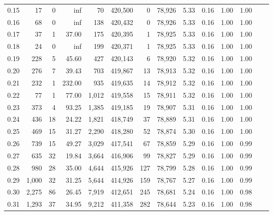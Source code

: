 \begin{tabular}{rrrrrrrrrrrrrr}
0.15 &      17 &      0 &     inf &       70 &  420,500 &       0 &  78,926 &  5.33 &  0.16 &  1.00 &      1.00 \\
0.16 &      68 &      0 &     inf &      138 &  420,432 &       0 &  78,926 &  5.33 &  0.16 &  1.00 &      1.00 \\
0.17 &      37 &      1 &   37.00 &      175 &  420,395 &       1 &  78,925 &  5.33 &  0.16 &  1.00 &      1.00 \\
0.18 &      24 &      0 &     inf &      199 &  420,371 &       1 &  78,925 &  5.33 &  0.16 &  1.00 &      1.00 \\
0.19 &     228 &      5 &   45.60 &      427 &  420,143 &       6 &  78,920 &  5.32 &  0.16 &  1.00 &      1.00 \\
0.20 &     276 &      7 &   39.43 &      703 &  419,867 &      13 &  78,913 &  5.32 &  0.16 &  1.00 &      1.00 \\
0.21 &     232 &      1 &  232.00 &      935 &  419,635 &      14 &  78,912 &  5.32 &  0.16 &  1.00 &      1.00 \\
0.22 &      77 &      1 &   77.00 &    1,012 &  419,558 &      15 &  78,911 &  5.32 &  0.16 &  1.00 &      1.00 \\
0.23 &     373 &      4 &   93.25 &    1,385 &  419,185 &      19 &  78,907 &  5.31 &  0.16 &  1.00 &      1.00 \\
0.24 &     436 &     18 &   24.22 &    1,821 &  418,749 &      37 &  78,889 &  5.31 &  0.16 &  1.00 &      1.00 \\
0.25 &     469 &     15 &   31.27 &    2,290 &  418,280 &      52 &  78,874 &  5.30 &  0.16 &  1.00 &      1.00 \\
0.26 &     739 &     15 &   49.27 &    3,029 &  417,541 &      67 &  78,859 &  5.29 &  0.16 &  1.00 &      0.99 \\
0.27 &     635 &     32 &   19.84 &    3,664 &  416,906 &      99 &  78,827 &  5.29 &  0.16 &  1.00 &      0.99 \\
0.28 &     980 &     28 &   35.00 &    4,644 &  415,926 &     127 &  78,799 &  5.28 &  0.16 &  1.00 &      0.99 \\
0.29 &   1,000 &     32 &   31.25 &    5,644 &  414,926 &     159 &  78,767 &  5.27 &  0.16 &  1.00 &      0.99 \\
0.30 &   2,275 &     86 &   26.45 &    7,919 &  412,651 &     245 &  78,681 &  5.24 &  0.16 &  1.00 &      0.98 \\
0.31 &   1,293 &     37 &   34.95 &    9,212 &  411,358 &     282 &  78,644 &  5.23 &  0.16 &  1.00 &      0.98 \\

\end{tabular}
